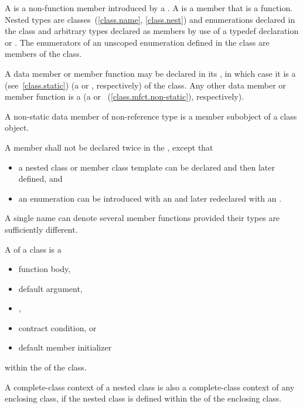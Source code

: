 \pnum
A  is a non-function member introduced by a
.
A  is a member that is a function.
Nested types are classes~(\ref{class.name}, \ref{class.nest}) and
enumerations declared in the class and arbitrary types
declared as members by use of a typedef declaration
or .
The enumerators of an unscoped enumeration defined in the class
are members of the class.

%
%
%
\pnum
A data member or member function
may be declared  in its ,
in which case it is a  (see~\ref{class.static})
(a  or
, respectively)
of the class.
Any other data member or member function is a 
(a  or
~(\ref{class.mfct.non-static}), respectively).
\begin{note} A non-static data member of non-reference
type is a member subobject of a class object.\end{note}

\pnum
A member shall not be declared twice in the
, except that
\begin{itemize}
\item a nested class or member
class template can be declared and then later defined, and
\item an
enumeration can be introduced with an  and later
redeclared with an .
\end{itemize}
\begin{note}
A single name can denote several member functions provided their types
are sufficiently different.
\end{note}

\pnum
{}%
A  of a class is a
\begin{itemize}
\item function body,
\item default argument,
\item {},
\item contract condition, or
\item default member initializer
\end{itemize}
within the  of the class.
\begin{note}
A complete-class context of a nested class is also a complete-class
context of any enclosing class, if the nested class is defined within
the  of the enclosing class.
\end{note}

